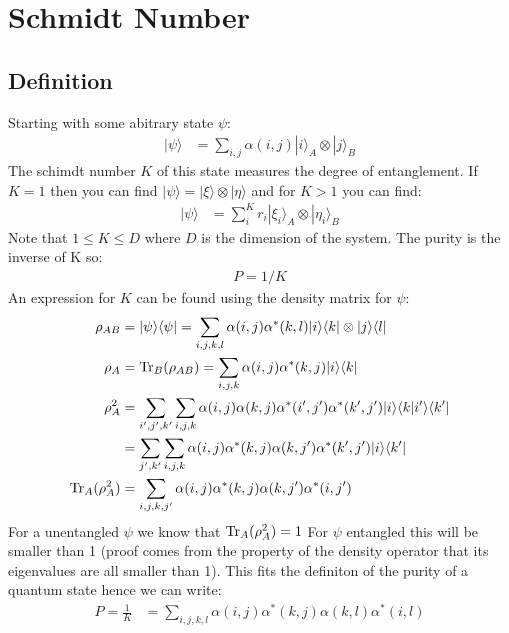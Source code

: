 \section{Schmidt Number}
\label{schmidtAppendix}
\subsection{Definition}
Starting with some abitrary state $\psi$:
\begin{align}
|\psi \rangle &= \sum_{i,j}\alpha(i,j)|i\rangle_A\otimes|j\rangle_B 
\end{align}
The schimdt number $K$ of this state measures the degree of entanglement. If $K=1$ then you can find $|\psi \rangle  = |\xi \rangle\otimes |\eta \rangle$ and for $K>1$ you can find: 
\begin{align}
|\psi \rangle &=\sum_{i}^{K} r_i|\xi_i \rangle_A\otimes |\eta_i \rangle_B
\end{align}
Note that $1\leq K\leq D$ where $D$ is the dimension of the system. The purity is the inverse of K so: 
\begin{align}
P=1/K
\end{align}
An expression for $K$ can be found using the density matrix for $\psi$:
\begin{align}
\rho_{AB} &=|\psi \rangle \langle\psi| = \sum_{i,j,k,l}\alpha(i,j)\alpha^*(k,l)|i\rangle\langle k| \otimes|j\rangle \langle l| \\
\rho_{A} &=\operatorname{Tr}_B(\rho_{AB}) = \sum_{i,j,k}\alpha(i,j)\alpha^*(k,j)|i\rangle \langle k|  \\
\rho_{A}^2 &= \sum_{i',j',k'}\sum_{i,j,k}\alpha(i,j)\alpha(k,j)\alpha^*(i',j')\alpha^*(k',j')|i\rangle \langle k|i'\rangle \langle k'|  \\
&= \sum_{j',k'}\sum_{i,j,k}\alpha(i,j)\alpha^*(k,j)\alpha(k,j')\alpha^*(k',j')|i\rangle \langle k'|  \\
\operatorname{Tr}_A(\rho_{A}^2)&= \sum_{i,j,k,j'}\alpha(i,j)\alpha^*(k,j)\alpha(k,j')\alpha^*(i,j')  \\
\end{align}
For a unentangled $\psi$ we know that $\operatorname{Tr}_A(\rho_{A}^2)=1$ For $\psi$ entangled this will be smaller than 1 (proof comes from the property of the density operator that its eigenvalues are all smaller than 1). This fits the definiton of the purity of a quantum state hence we can write:
\begin{align} \label{theShit}
P = \frac{1}{K}&= \sum_{i,j,k,l}\alpha(i,j)\alpha^*(k,j)\alpha(k,l)\alpha^*(i,l)
\end{align}
